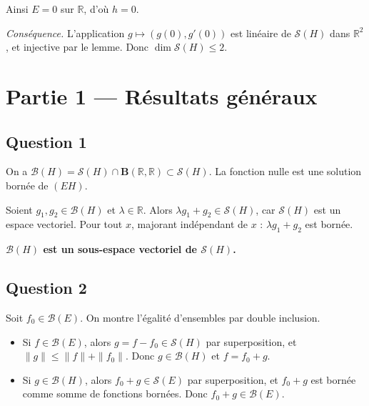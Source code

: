 \documentclass[11pt,a4paper]{article}
\providecommand{\tightlist}{\setlength{\itemsep}{0pt}\setlength{\parskip}{0pt}}
\newcommand{\equationajustee}[1]{%
  \sbox{\boiteequation}{$\displaystyle #1$}%
  \ifdim\wd\boiteequation>\linewidth
    \[\resizebox{\linewidth}{!}{\usebox{\boiteequation}}\]%
  \else
    \[#1\]%
  \fi}
\begin{document}
Ainsi \(E=0\) sur \(\mathbb R\), d'où \(h=0\).

\emph{Conséquence.} L'application \(g\mapsto(g(0),g'(0))\) est linéaire de \(\mathcal S(H)\) dans \(\mathbb R^2\), et injective par le lemme. Donc \(\dim\mathcal S(H)\le2\).

\hypertarget{partie-1-ruxe9sultats-guxe9nuxe9raux}{%
\section{Partie 1 --- Résultats généraux}\label{partie-1-ruxe9sultats-guxe9nuxe9raux}}

\hypertarget{question-1}{%
\subsection{Question 1}\label{question-1}}

On a \(\mathcal B(H)=\mathcal S(H)\cap\mathbf B(\mathbb R,\allowbreak \mathbb R)\subset\mathcal S(H)\). La fonction nulle est une solution bornée de \((EH)\).

Soient \(g_1,g_2\in\mathcal B(H)\) et \(\lambda\in\mathbb R\). Alors \(\lambda g_1+g_2\in\mathcal S(H)\), car \(\mathcal S(H)\) est un espace vectoriel. Pour tout \(x\),
\equationajustee{|\lambda g_1(x)+g_2(x)|\le|\lambda|\,\|g_1\|+\|g_2\|,}
majorant indépendant de \(x\) : \(\lambda g_1+g_2\) est bornée.

\textbf{\(\mathcal B(H)\) est un sous-espace vectoriel de \(\mathcal S(H)\).}

\hypertarget{question-2}{%
\subsection{Question 2}\label{question-2}}

Soit \(f_0\in\mathcal B(E)\). On montre l'égalité d'ensembles par double inclusion.

\begin{itemize}
\tightlist
\item
  Si \(f\in\mathcal B(E)\), alors \(g=f-f_0\in\mathcal S(H)\) par superposition, et \(\|g\|\le\|f\|+\|f_0\|\). Donc \(g\in\mathcal B(H)\) et \(f=f_0+g\).
\item
  Si \(g\in\mathcal B(H)\), alors \(f_0+g\in\mathcal S(E)\) par superposition, et \(f_0+g\) est bornée comme somme de fonctions bornées. Donc \(f_0+g\in\mathcal B(E)\).
\end{itemize}

\equationajustee{\boxed{\mathcal B(E)=\{f_0+g,\ g\in\mathcal B(H)\}.}}
\end{document}
